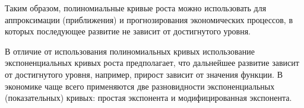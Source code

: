 Таким образом, полиномиальные кривые роста можно использовать для аппроксимации (приближения) и прогнозирования экономических процессов, в которых последующее развитие не зависит от достигнутого уровня.

В отличие от использования полиномиальных кривых использование экспоненциальных кривых роста предполагает, что дальнейшее развитие зависит от достигнутого уровня, например, прирост зависит от значения функции. В экономике чаще всего применяются две разновидности экспоненциальных (показательных) кривых: простая экспонента и модифицированная экспонента.




























